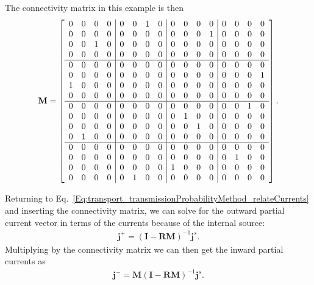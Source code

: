 The connectivity matrix in this example is then
\begin{align}
  \mathbf{M} = \left[ \begin{array}{c c c c|c c c c|c c c c|c c c c}
  0 & 0 & 0 & 0 &		0 & 0 & 1 & 0 &			0 & 0 & 0 & 0 &			0 & 0 & 0 & 0 \\
  0 & 0 & 0 & 0 &		0 & 0 & 0 & 0 &			0 & 0 & 0 & 1 &			0 & 0 & 0 & 0 \\  
  0 & 0 & 1 & 0 &		0 & 0 & 0 & 0 &			0 & 0 & 0 & 0 &			0 & 0 & 0 & 0 \\
  0 & 0 & 0 & 0 &		0 & 0 & 0 & 0 &			0 & 0 & 0 & 0 &			0 & 0 & 0 & 0 \\ \hline
%
  0 & 0 & 0 & 0 &		0 & 0 & 0 & 0 &			0 & 0 & 0 & 0 & 		0 & 0 & 0 & 0 \\
  0 & 0 & 0 & 0 &		0 & 0 & 0 & 0 &			0 & 0 & 0 & 0 & 		0 & 0 & 0 & 1 \\
  1 & 0 & 0 & 0 &		0 & 0 & 0 & 0 &			0 & 0 & 0 & 0 & 		0 & 0 & 0 & 0 \\
  0 & 0 & 0 & 0 &		0 & 0 & 0 & 0 &			0 & 0 & 0 & 0 & 		0 & 0 & 0 & 0 \\ \hline
%
  0 & 0 & 0 & 0 &		0 & 0 & 0 & 0 &			0 & 0 & 0 & 0 & 		0 & 0 & 1 & 0 \\
  0 & 0 & 0 & 0 &		0 & 0 & 0 & 0 &			0 & 1 & 0 & 0 & 		0 & 0 & 0 & 0 \\
  0 & 0 & 0 & 0 &		0 & 0 & 0 & 0 &			0 & 0 & 1 & 0 & 		0 & 0 & 0 & 0 \\
  0 & 1 & 0 & 0 &		0 & 0 & 0 & 0 &			0 & 0 & 0 & 0 & 		0 & 0 & 0 & 0 \\ \hline
%  
  0 & 0 & 0 & 0 &		0 & 0 & 0 & 0 &			0 & 0 & 0 & 0 & 		0 & 0 & 0 & 0 \\
  0 & 0 & 0 & 0 &		0 & 0 & 0 & 0 &			0 & 0 & 0 & 0 & 		0 & 1 & 0 & 0 \\
  0 & 0 & 0 & 0 &		0 & 0 & 0 & 0 &			1 & 0 & 0 & 0 & 		0 & 0 & 0 & 0 \\
  0 & 0 & 0 & 0 &		0 & 1 & 0 & 0 &			0 & 0 & 0 & 0 & 		0 & 0 & 0 & 0 \\ \end{array} \right] .
\end{align}

Returning to Eq.~\eqref{Eq:transport_transmissionProbabilityMethod_relateCurrents} and inserting the connectivity matrix, we can solve for the outward partial current vector in terms of the currents because of the internal source:
\begin{align}
  \mathbf{j}^+ = \left( \mathbf{I} - \mathbf{R} \mathbf{M} \right)^{-1} \mathbf{j}^s .
\end{align}
Multiplying by the connectivity matrix we can then get the inward partial currents as
\begin{align} \label{Eq:transport_inwardPartialCurrent_responseMatrix_finalResult}
  \mathbf{j}^- = \mathbf{M} \left( \mathbf{I} - \mathbf{R} \mathbf{M} \right)^{-1} \mathbf{j}^s .
\end{align}

